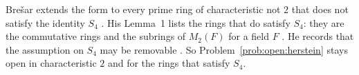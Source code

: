 Bre\v{s}ar extends the form to every prime ring of characteristic not $2$ that
does not satisfy the identity $S_4$ \cite[Theorem~5,
p.~529]{Bresar1993LieTAMS}. His Lemma~1 lists the rings that do satisfy $S_4$:
they are the commutative rings and the subrings of $M_2(F)$ for a field $F$
\cite[Lemma~1, p.~530]{Bresar1993LieTAMS}. He records that the assumption on
$S_4$ may be removable \cite[p.~528]{Bresar1993LieTAMS}. So
Problem~\ref{prob:open:herstein} stays open in characteristic $2$ and for the
rings that satisfy $S_4$.

